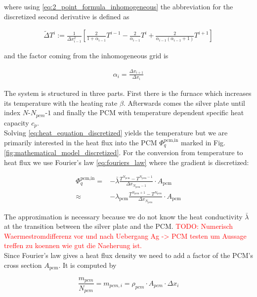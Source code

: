 \documentclass{scrartcl}[12pt, halfparskip]
\newcommand{\todo}[1]{\textcolor{red}{TODO: #1}}
\begin{document}
where using \eqref{eq:2_point_formula_inhomogeneous} the abbreviation for the discretized second derivative is defined as

\begin{align}
	\tilde{\Delta} T^i := \frac{1}{\Delta x_{i-1}^2} \left[ \frac{2}{1+\alpha_{i-1}} T^{i-1} - \frac{2}{\alpha_{i-1}} T^{i} + \frac{2}{\alpha_{i-1} (\alpha_{i-1} + 1)} T^{i+1} \right]
\end{align}

and the factor coming from the inhomogeneous grid is

\begin{align}
	\alpha_i = \frac{\Delta x_{i+1}}{\Delta x_{i}}
\end{align}

The system is structured in three parts. First there is the furnace which increases its temperature with the heating rate $\beta$. Afterwards comes the silver plate until index $N$-$N_{pcm}$-$1$ and finally the PCM with temperature dependent specific heat capacity $c_p$. \\

Solving \eqref{eq:heat_equation_discretized} yields the temperature but we are primarily interested in the heat flux into the PCM $\varPhi_{q}^{\text{pcm,in}}$ marked in Fig. \ref{fig:mathematical_model_discretized}. For the conversion from temperature to heat flux we use Fourier's law \eqref{eq:fouriers_law} where the gradient is discretized:

\begin{align}
	\varPhi_{q}^{\text{pcm,in}} = & - \bar{\lambda} \frac{T^{N_{\text{pcm}}} - T^{N_{\text{pcm}}-1}}{\Delta x_{N_{\text{pcm}}-1}} \cdot A_{\text{pcm}} \\
	\approx & - \lambda_{\text{pcm}} \frac{T^{N_{\text{pcm}}+1} - T^{N_{\text{pcm}}}}{\Delta x_{N_{\text{pcm}}}} \cdot A_{\text{pcm}} \nonumber
\end{align}

The approximation is necessary because we do not know the heat conductivity $\bar{\lambda}$ at the transition between the silver plate and the PCM. \todo{Numerisch Waermestromdifferenz vor und nach Uebergang Ag -> PCM testen um Aussage treffen zu koennen wie gut die Naeherung ist.} \\
Since Fourier's law gives a heat flux density we need to add a factor of the PCM's cross section $A_{\text{pcm}}$. It is computed by

\begin{equation}
	\frac{m_{pcm}}{N_{pcm}} = m_{pcm,i} = \rho_{pcm} \cdot A_{pcm} \cdot \Delta x_i 
\end{equation}
\end{document}
